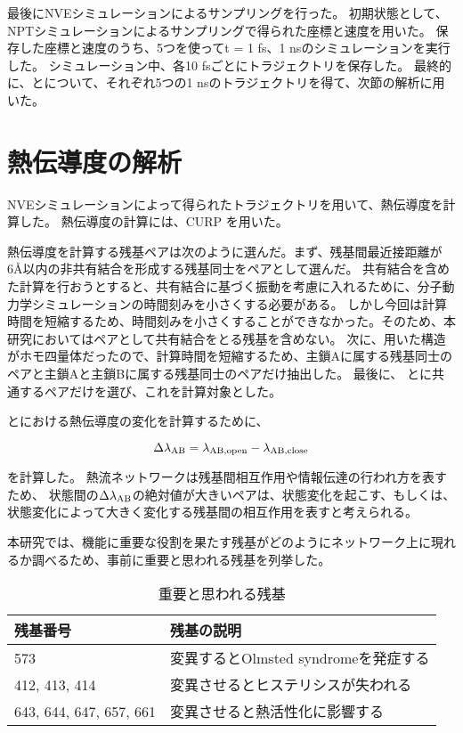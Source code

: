 最後にNVEシミュレーションによるサンプリングを行った。
初期状態として、NP\gamma Tシミュレーションによるサンプリングで得られた座標と速度を用いた。
保存した座標と速度のうち、5つを使って\Delta t = 1 fs、1 nsのシミュレーションを実行した。
シミュレーション中、各10 fsごとにトラジェクトリを保存した。
最終的に、\openFortyTwo と\closeFortyTwo について、それぞれ5つの1 nsのトラジェクトリを得て、次節の解析に用いた。

\section{熱伝導度の解析}

NVEシミュレーションによって得られたトラジェクトリを用いて、熱伝導度を計算した。
熱伝導度の計算には、CURP\autocite{ishikura_energy_2015,ota_energy_2019,yamatoComputationalStudyThermal2022,wangSiteselectiveHeatCurrent2023} を用いた。

熱伝導度を計算する残基ペアは次のように選んだ。まず、残基間最近接距離が6\AA 以内の非共有結合を形成する残基同士をペアとして選んだ。
共有結合を含めた計算を行おうとすると、共有結合に基づく振動を考慮に入れるために、分子動力学シミュレーションの時間刻みを小さくする必要がある。
しかし今回は計算時間を短縮するため、時間刻みを小さくすることができなかった。そのため、本研究においてはペアとして共有結合をとる残基を含めない。
次に、用いた構造がホモ四量体だったので、計算時間を短縮するため、主鎖Aに属する残基同士のペアと主鎖Aと主鎖Bに属する残基同士のペアだけ抽出した。
最後に、 \openFortyTwo と\closeFortyTwo に共通するペアだけを選び、これを計算対象とした。

\openFortyTwo と\closeFortyTwo における熱伝導度の変化を計算するために、

\begin{equation}
  \label{eq:thermal_conductivity_difference}
  \Delta \lambda_{\rm{AB}} = \lambda_{\rm{AB, open}} - \lambda_{\rm{AB, close}}
\end{equation}

を計算した。
熱流ネットワークは残基間相互作用や情報伝達の行われ方を表すため、
状態間の$\Delta \lambda_{\rm{AB}}$の絶対値が大きいペアは、状態変化を起こす、もしくは、状態変化によって大きく変化する残基間の相互作用を表すと考えられる。

本研究では、機能に重要な役割を果たす残基がどのようにネットワーク上に現れるか調べるため、事前に重要と思われる残基を列挙した。

\begin{table}[!ht]
  \centering
  \caption{重要と思われる残基}
  \begin{tabular}{ll}
  \hline
      残基番号                & 残基の説明            \\
      \hline
      573                     & 変異するとOlmsted syndromeを発症する\autocite{lin_exome_2012,lai-cheong_recurrent_2012,nilius_trpv_2013} \\
      412, 413, 414           & 変異させるとヒステリシスが失われる\autocite{liu_single-residue_2017} \\
      643, 644, 647, 657, 661 & 変異させると熱活性化に影響する\autocite{grandl_pore_2008} \\
  \end{tabular}
  \label{tab:important_residues}
\end{table}

